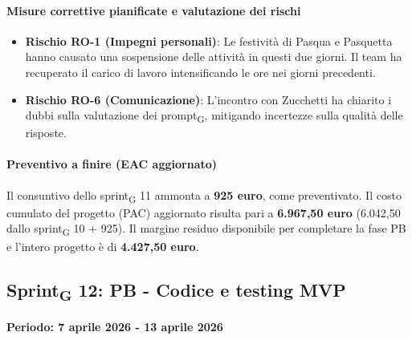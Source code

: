 \documentclass[11pt,a4paper]{article}
\newcommand{\gls}[1]{#1\textsubscript{G}}
\begin{document}
\paragraph{Misure correttive pianificate e valutazione dei rischi}
\begin{itemize}
    \item \textbf{Rischio RO-1 (Impegni personali)}: Le festività di Pasqua e Pasquetta hanno causato una sospensione delle attività in questi due giorni. Il team ha recuperato il carico di lavoro intensificando le ore nei giorni precedenti.
    \item \textbf{Rischio RO-6 (Comunicazione)}: L'incontro con Zucchetti ha chiarito i dubbi sulla valutazione dei \gls{prompt}, mitigando incertezze sulla qualità delle risposte.
\end{itemize}

\paragraph{Preventivo a finire (EAC aggiornato)}
Il consuntivo dello \gls{sprint} 11 ammonta a \textbf{925 euro}, come preventivato.
Il costo cumulato del progetto (PAC) aggiornato risulta pari a \textbf{6.967,50 euro} (6.042,50 dallo \gls{sprint} 10 + 925). 
Il margine residuo disponibile per completare la fase PB e l'intero progetto è di \textbf{4.427,50 euro}.

\newpage


\subsection{\gls{Sprint} 12: PB - Codice e testing MVP}
{\textbf{Periodo: 7 aprile 2026 - 13 aprile 2026}\par}
\end{document}
